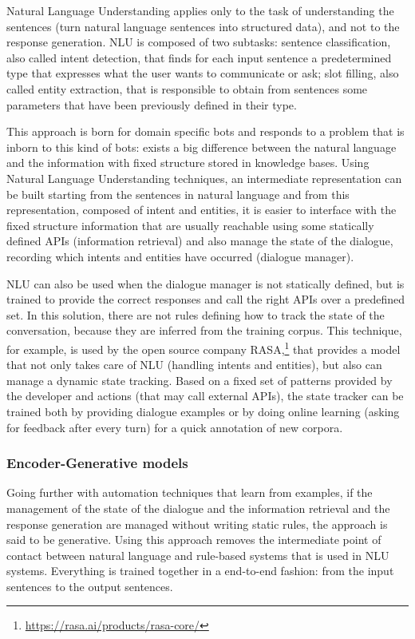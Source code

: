 Natural Language Understanding applies only to the task of understanding the sentences (turn natural language sentences into structured data), and not to the response generation. NLU is composed of two subtasks: sentence classification, also called intent detection, that finds for each input sentence a predetermined type that expresses what the user wants to communicate or ask; slot filling, also called entity extraction, that is responsible to obtain from sentences some parameters that have been previously defined in their type.

This approach is born for domain specific bots and responds to a problem that is inborn to this kind of bots: exists a big difference between the natural language and the information with fixed structure stored in knowledge bases. Using Natural Language Understanding techniques, an intermediate representation can be built starting from the sentences in natural language and from this representation, composed of intent and entities, it is easier to interface with the fixed structure information that are usually reachable using some statically defined APIs (information retrieval) and also manage the state of the dialogue, recording which intents and entities have occurred (dialogue manager).

NLU can also be used when the dialogue manager is not statically defined, but is trained to provide the correct responses and call the right APIs over a predefined set. In this solution, there are not rules defining how to track the state of the conversation, because they are inferred from the training corpus. This technique, for example, is used by the open source company RASA,\footnote{\url{https://rasa.ai/products/rasa-core/}} that provides a model that not only takes care of NLU (handling intents and entities), but also can manage a dynamic state tracking. Based on a fixed set of patterns provided by the developer and actions (that may call external APIs), the state tracker can be trained both by providing dialogue examples or by doing online learning (asking for feedback after every turn) for a quick annotation of new corpora.

\subsubsection{Encoder-Generative models}
\label{soaGenerativeApproach}

Going further with automation techniques that learn from examples, if the management of the state of the dialogue and the information retrieval and the response generation are managed without writing static rules, the approach is said to be generative. Using this approach removes the intermediate point of contact between natural language and rule-based systems that is used in NLU systems. Everything is trained together in a end-to-end fashion: from the input sentences to the output sentences.

